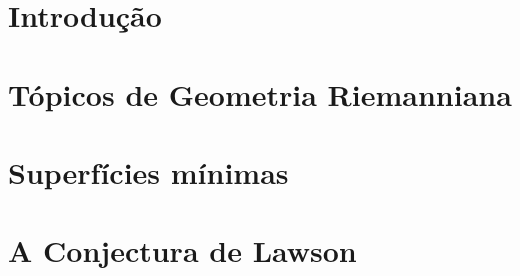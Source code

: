 \documentclass[mestrado, pre-defesa]{packages/icmc}
\begin{document}
\textual

\newcommand{\comando}[1]{\textbf{$\backslash$#1}}



\chapter{Introdução}
\label{chapter:introducao}


\chapter{Tópicos de Geometria Riemanniana}
\label{chapter:topicos-de-geometria-riemanniana}


\chapter{Superfícies mínimas}
\label{chapter:superficies-minimas}


\chapter{A Conjectura de Lawson}
\label{chapter:a-conjectura-de-lawson}


%
%
%
%
%
%
%
%
%
%
%
%
\end{document}

